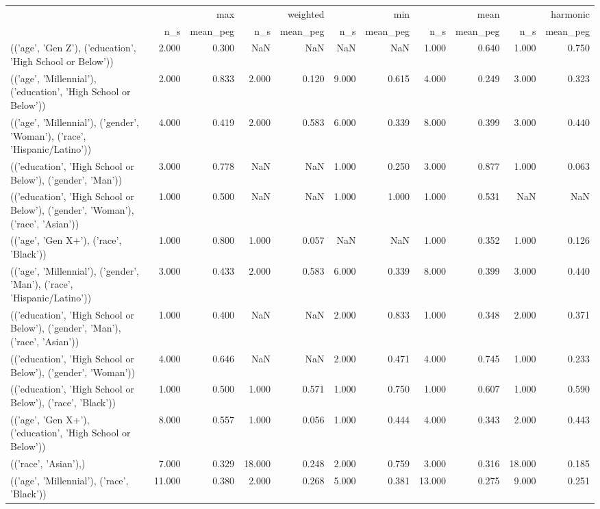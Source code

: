 \begin{tabular}{lrrrrrrrrrr}
\toprule
 & \multicolumn{2}{r}{max} & \multicolumn{2}{r}{weighted} & \multicolumn{2}{r}{min} & \multicolumn{2}{r}{mean} & \multicolumn{2}{r}{harmonic} \\
 & n_s & mean_peg & n_s & mean_peg & n_s & mean_peg & n_s & mean_peg & n_s & mean_peg \\
\midrule
(('age', 'Gen Z'), ('education', 'High School or Below')) & 2.000 & 0.300 & NaN & NaN & NaN & NaN & 1.000 & 0.640 & 1.000 & 0.750 \\
(('age', 'Millennial'), ('education', 'High School or Below')) & 2.000 & 0.833 & 2.000 & 0.120 & 9.000 & 0.615 & 4.000 & 0.249 & 3.000 & 0.323 \\
(('age', 'Millennial'), ('gender', 'Woman'), ('race', 'Hispanic/Latino')) & 4.000 & 0.419 & 2.000 & 0.583 & 6.000 & 0.339 & 8.000 & 0.399 & 3.000 & 0.440 \\
(('education', 'High School or Below'), ('gender', 'Man')) & 3.000 & 0.778 & NaN & NaN & 1.000 & 0.250 & 3.000 & 0.877 & 1.000 & 0.063 \\
(('education', 'High School or Below'), ('gender', 'Woman'), ('race', 'Asian')) & 1.000 & 0.500 & NaN & NaN & 1.000 & 1.000 & 1.000 & 0.531 & NaN & NaN \\
(('age', 'Gen X+'), ('race', 'Black')) & 1.000 & 0.800 & 1.000 & 0.057 & NaN & NaN & 1.000 & 0.352 & 1.000 & 0.126 \\
(('age', 'Millennial'), ('gender', 'Man'), ('race', 'Hispanic/Latino')) & 3.000 & 0.433 & 2.000 & 0.583 & 6.000 & 0.339 & 8.000 & 0.399 & 3.000 & 0.440 \\
(('education', 'High School or Below'), ('gender', 'Man'), ('race', 'Asian')) & 1.000 & 0.400 & NaN & NaN & 2.000 & 0.833 & 1.000 & 0.348 & 2.000 & 0.371 \\
(('education', 'High School or Below'), ('gender', 'Woman')) & 4.000 & 0.646 & NaN & NaN & 2.000 & 0.471 & 4.000 & 0.745 & 1.000 & 0.233 \\
(('education', 'High School or Below'), ('race', 'Black')) & 1.000 & 0.500 & 1.000 & 0.571 & 1.000 & 0.750 & 1.000 & 0.607 & 1.000 & 0.590 \\
(('age', 'Gen X+'), ('education', 'High School or Below')) & 8.000 & 0.557 & 1.000 & 0.056 & 1.000 & 0.444 & 4.000 & 0.343 & 2.000 & 0.443 \\
(('race', 'Asian'),) & 7.000 & 0.329 & 18.000 & 0.248 & 2.000 & 0.759 & 3.000 & 0.316 & 18.000 & 0.185 \\
(('age', 'Millennial'), ('race', 'Black')) & 11.000 & 0.380 & 2.000 & 0.268 & 5.000 & 0.381 & 13.000 & 0.275 & 9.000 & 0.251 \\

\end{tabular}
